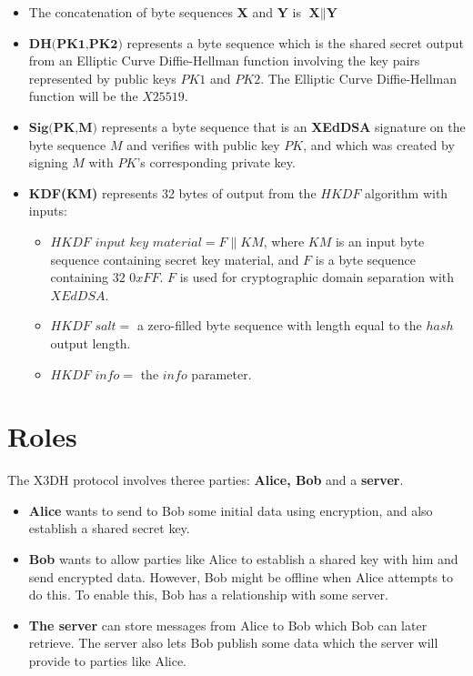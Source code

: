 \begin{itemize}
  \item The concatenation of byte sequences \textbf{X} and \textbf{Y} is $\textbf{X} \| \textbf{Y}$
  \item $\textbf{DH(PK1,PK2)}$ represents a byte sequence which is the shared secret output from an Elliptic Curve Diffie-Hellman function involving the key pairs represented by public keys $PK1$ and $PK2$. The Elliptic Curve Diffie-Hellman function will be the $X25519$.
  \item $\textbf{Sig(PK,M)}$ represents a byte sequence that is an \textbf{XEdDSA} signature on the byte sequence $M$ and verifies with public key $PK$, and which was created by signing $M$ with $PK$'s corresponding private key.
  \item \textbf{KDF(KM)} represents 32 bytes of output from the $HKDF$ algorithm with inputs:
  \begin{itemize}
    \item $HKDF$ $input$ $key$ $material = F \| KM$, where $KM$ is an input byte sequence containing secret key material, and $F$ is a byte sequence containing $32$ $0xFF$. $F$ is used for cryptographic domain separation with $XEdDSA$.
    \item $HKDF$ $salt =$ a zero-filled byte sequence with length equal to the $hash$ output length.
    \item $HKDF$ $info =$ the $info$ parameter.
  \end{itemize}
\end{itemize}

\section{Roles}
\label{sec:Roles}

The X3DH protocol involves theree parties: \textbf{Alice, Bob} and a \textbf{server}.

\begin{itemize}
  \item \textbf{Alice} wants to send to Bob some initial data using encryption, and also establish a shared secret key.
  \item \textbf{Bob} wants to allow parties like Alice to establish a shared key with him and send encrypted data. However, Bob might be offline when Alice attempts to do this. To enable this, Bob has a relationship with some server.
  \item \textbf{The server} can store messages from Alice to Bob which Bob can later retrieve. The server also lets Bob publish some data which the server will provide to parties like Alice.
\end{itemize}

